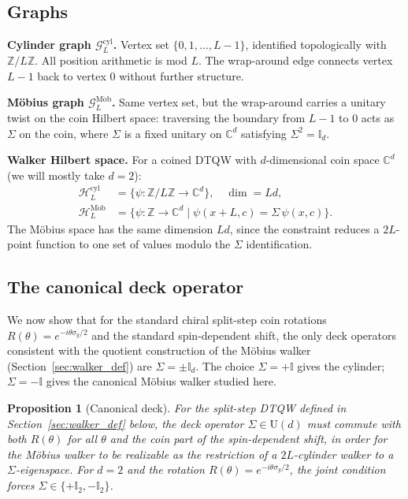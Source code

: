 \documentclass[aps,pra,reprint,amsmath,amssymb,superscriptaddress,nofootinbib,longbibliography]{revtex4-2}
\newcommand{\Z}{\mathbb{Z}}
\newcommand{\C}{\mathbb{C}}
\newcommand{\I}{\mathbb{I}}
\newcommand{\sigy}{\sigma_y}
\newcommand{\Mob}{\mathrm{M\ddot{o}b}}
\newcommand{\cyl}{\mathrm{cyl}}
\newtheorem{proposition}{Proposition}
\begin{document}
\subsection{Graphs}

\textbf{Cylinder graph $\mathcal{G}_L^{\cyl}$.} Vertex set $\{0, 1, \dots, L-1\}$, identified topologically with $\Z/L\Z$. All position arithmetic is mod $L$. The wrap-around edge connects vertex $L-1$ back to vertex $0$ without further structure.

\textbf{M\"obius graph $\mathcal{G}_L^\Mob$.} Same vertex set, but the wrap-around carries a unitary twist on the coin Hilbert space: traversing the boundary from $L-1$ to $0$ acts as $\Sigma$ on the coin, where $\Sigma$ is a fixed unitary on $\C^d$ satisfying $\Sigma^2 = \I_d$.

\textbf{Walker Hilbert space.} For a coined DTQW with $d$-dimensional coin space $\C^d$ (we will mostly take $d = 2$):
\begin{align}
\mathcal{H}_L^\cyl &= \{\psi: \Z/L\Z \to \C^d\}, \quad \dim = Ld, \\
\mathcal{H}_L^\Mob &= \{\psi: \Z \to \C^d \mid \psi(x{+}L, c) = \Sigma\,\psi(x, c)\}.
\end{align}
The M\"obius space has the same dimension $Ld$, since the constraint reduces a $2L$-point function to one set of values modulo the $\Sigma$ identification.

\subsection{The canonical deck operator}
\label{sec:canonical_deck}

We now show that for the standard chiral split-step coin rotations $R(\theta) = e^{-i\theta\sigy/2}$ and the standard spin-dependent shift, the only deck operators consistent with the quotient construction of the M\"obius walker (Section~\ref{sec:walker_def}) are $\Sigma = \pm\I_d$. The choice $\Sigma = +\I$ gives the cylinder; $\Sigma = -\I$ gives the canonical M\"obius walker studied here.

\begin{proposition}[Canonical deck]
\label{prop:canonical_deck}
For the split-step DTQW defined in Section~\ref{sec:walker_def} below, the deck operator $\Sigma \in \mathrm{U}(d)$ must commute with both $R(\theta)$ for all $\theta$ and the coin part of the spin-dependent shift, in order for the M\"obius walker to be realizable as the restriction of a $2L$-cylinder walker to a $\Sigma$-eigenspace. For $d = 2$ and the rotation $R(\theta) = e^{-i\theta\sigy/2}$, the joint condition forces $\Sigma \in \{+\I_2, -\I_2\}$.
\end{proposition}
\end{document}
